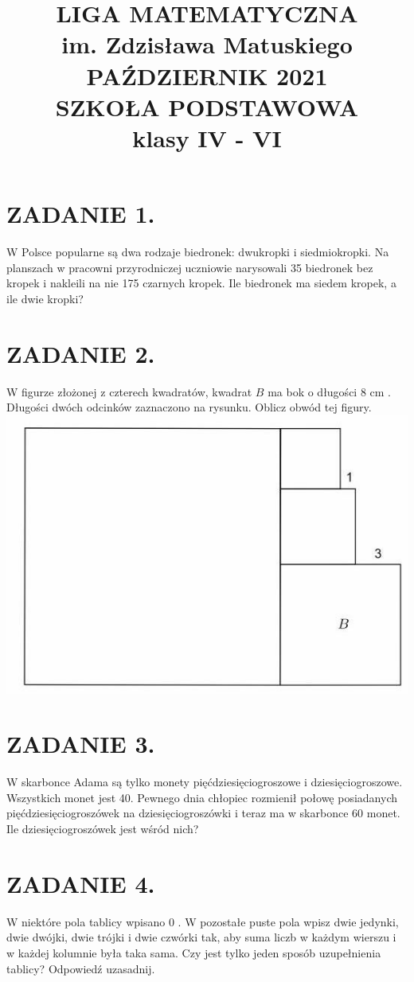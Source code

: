 \documentclass[10pt]{article}
\title{LIGA MATEMATYCZNA \\
 im. Zdzisława Matuskiego \\
 PAŹDZIERNIK 2021 \\
 SZKOŁA PODSTAWOWA \\
 klasy IV - VI }
\author{}
\date{}
\begin{document}
\maketitle
\section*{ZADANIE 1.}
W Polsce popularne są dwa rodzaje biedronek: dwukropki i siedmiokropki. Na planszach w pracowni przyrodniczej uczniowie narysowali 35 biedronek bez kropek i nakleili na nie 175 czarnych kropek. Ile biedronek ma siedem kropek, a ile dwie kropki?

\section*{ZADANIE 2.}
W figurze złożonej z czterech kwadratów, kwadrat \(B\) ma bok o długości 8 cm . Długości dwóch odcinków zaznaczono na rysunku. Oblicz obwód tej figury.\\
\includegraphics[max width=\textwidth, center]{2024_11_21_9c11f7163a8aec513b60g-1}

\section*{ZADANIE 3.}
W skarbonce Adama są tylko monety pięćdziesięciogroszowe i dziesięciogroszowe. Wszystkich monet jest 40. Pewnego dnia chłopiec rozmienił połowę posiadanych pięćdziesięciogroszówek na dziesięciogroszówki i teraz ma w skarbonce 60 monet. Ile dziesięciogroszówek jest wśród nich?

\section*{ZADANIE 4.}
W niektóre pola tablicy wpisano 0 . W pozostałe puste pola wpisz dwie jedynki, dwie dwójki, dwie trójki i dwie czwórki tak, aby suma liczb w każdym wierszu i w każdej kolumnie była taka sama. Czy jest tylko jeden sposób uzupełnienia tablicy? Odpowiedź uzasadnij.
\end{document}
